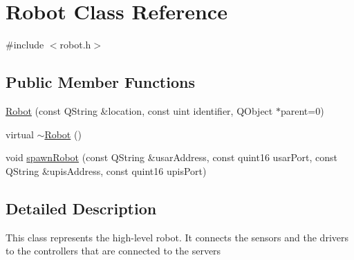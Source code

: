 \hypertarget{classRobot}{
\section{Robot Class Reference}
\label{classRobot}
}


{\ttfamily \#include $<$robot.h$>$}

\subsection*{Public Member Functions}
\begin{DoxyCompactItemize}
\item 
\hyperlink{classRobot_a0f2108bd63b096f1b55fee82f7366895}{Robot} (const QString \&location, const uint identifier, QObject $\ast$parent=0)
\item 
virtual \hyperlink{classRobot_a924320124b09c2f2ac1621aa210d5f38}{$\sim$Robot} ()
\item 
void \hyperlink{classRobot_aba6fa8d5cbf173ca0df078c6212612fd}{spawnRobot} (const QString \&usarAddress, const quint16 usarPort, const QString \&upisAddress, const quint16 upisPort)
\end{DoxyCompactItemize}


\subsection{Detailed Description}
This class represents the high-\/level robot. It connects the sensors and the drivers to the controllers that are connected to the servers 

